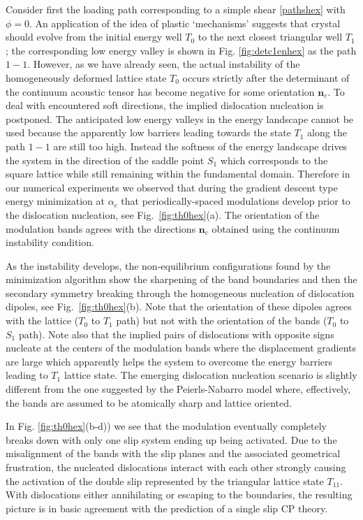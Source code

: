 \documentclass[CRPHYS,Unicode,manuscript]{cedram}
\begin{document}
Consider first    the  loading path corresponding to a simple shear   \eqref{pathshex}  with  $\phi=0$.  An application of the idea of plastic `mechanisms'  suggests that crystal should evolve  from the initial energy well  $T_0$ to the next closest triangular well $T_{1}$; the corresponding 
 low energy valley   is shown in Fig. \ref{fig:detc1enhex}  as the path $1-1$. However, as we have already seen,  the actual  instability of the  homogeneously deformed  lattice state $T_0$ occurs strictly after  the determinant of the continuum acoustic tensor has become  negative for some orientation  $\pmb n_c$.  To deal with encountered soft directions,  the  implied dislocation  nucleation is postponed. The anticipated low energy valleys in the energy landscape cannot be  used  because the apparently low  barriers  leading towards the state $T_1$ along the path $1-1$ are still too  high. Instead the softness of the energy landscape  drives the system  in the direction of the saddle point  $S_1$ which corresponds to the square lattice while still remaining within  the fundamental domain.  Therefore in our numerical experiments   we observed that during the gradient descent type energy minimization at  $\alpha_c$  that periodically-spaced modulations develop prior to the dislocation nucleation, see Fig.~\ref{fig:th0hex}(a). The orientation of the  modulation bands   agrees with the directions $\pmb n_c$   obtained using  the continuum  instability  condition.

As the instability develops, the non-equilibrium configurations found by the minimization algorithm  show the sharpening of the   band boundaries and then the  secondary symmetry breaking  through the homogeneous  nucleation of dislocation dipoles, see Fig.~\ref{fig:th0hex}(b). Note that the 
 orientation of these dipoles agrees with the lattice ($T_0$ to  $T_{1}$ path) but not with the orientation of the bands ($T_0$ to  $S_{1}$ path).   Note also that the implied pairs of dislocations with opposite signs  nucleate at the centers  of the modulation bands   where the displacement gradients are  large  which apparently helps the system to overcome the energy barriers  leading  to  $T_{1}$ lattice state. The emerging dislocation nucleation scenario is slightly different from the one suggested by the Peierls-Nabarro model where, effectively,  the bands are assumed to be  atomically sharp  and lattice oriented.  
 

In   Fig. \ref{fig:th0hex}(b-d)) we see that the modulation eventually completely breaks down  with only  one slip system  ending up being  activated.  Due to the misalignment of the bands with  the slip planes and the associated geometrical frustration, the nucleated dislocations  interact with each other  strongly causing  the  activation of  the double   slip  represented by the triangular lattice state   $T_{11}$. With dislocations either annihilating or escaping to the boundaries,  the resulting picture is in basic agreement with the prediction of a single slip CP theory.
\end{document}
